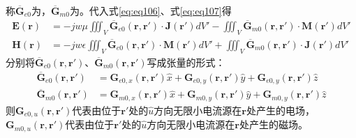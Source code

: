\documentclass{article}
\numberwithin{equation}{section}
\renewcommand{\vec}[1]{\boldsymbol{#1}}
\begin{document}
称$\overline{\mathbf{G}}_{e0}$为\textbf{\color{blue}{自由空间电并矢格林函数}}，$\overline{\mathbf{G}}_{m0}$为\textbf{\color{blue}{自由空间磁并矢格林函数}}。代入式\ref{eq:eq106}、式\ref{eq:eq107}得
\begin{align}
    \label{eq:eq110}
    \mathbf{E}(\vec{r})&=-jw\mu\iiint_V\overline{\mathbf{G}}_{e0}(\vec{r},\vec{r}')\cdot \mathbf{J}(\vec{r}')dV'-\iiint_V\overline{\mathbf{G}}_{m0}(\vec{r},\vec{r}')\cdot \mathbf{M}(\vec{r}')dV' \\
    \label{eq:eq111}
    \mathbf{H}(\vec{r})&=-jw\epsilon\iiint_V\overline{\mathbf{G}}_{e0}(\vec{r},\vec{r}')\cdot \mathbf{M}(\vec{r}')dV'+\iiint_V\overline{\mathbf{G}}_{m0}(\vec{r},\vec{r}')\cdot \mathbf{J}(\vec{r}')dV'
\end{align}
分别将$\overline{\mathbf{G}}_{e0}(\vec{r},\vec{r}')$、$\overline{\mathbf{G}}_{m0}(\vec{r},\vec{r}')$写成张量的形式：
\begin{align}
    \label{eq:eq112}
    \overline{\mathbf{G}}_{e0}(\vec{r},\vec{r}')&={\mathbf{G}}_{e0,x}(\vec{r},\vec{r}')\hat{x}+{\mathbf{G}}_{e0,y}(\vec{r},\vec{r}')\hat{y}+{\mathbf{G}}_{e0,y}(\vec{r},\vec{r}')\hat{z} \\
    \label{eq:eq113}
    \overline{\mathbf{G}}_{m0}(\vec{r},\vec{r}')&={\mathbf{G}}_{m0,x}(\vec{r},\vec{r}')\hat{x}+{\mathbf{G}}_{m0,y}(\vec{r},\vec{r}')\hat{y}+{\mathbf{G}}_{m0,y}(\vec{r},\vec{r}')\hat{z}
\end{align}
则${\mathbf{G}}_{e0,u}(\vec{r},\vec{r}')$代表由位于$\vec{r}'$处的$\hat{u}$方向无限小电流源在$\vec{r}$处产生的电场，${\mathbf{G}}_{m0,u}(\vec{r},\vec{r}')$代表由位于$\vec{r}'$处的$\hat{u}$方向无限小电流源在$\vec{r}$处产生的磁场。
\end{document}
